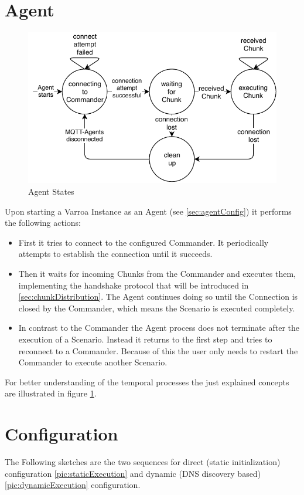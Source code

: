 \section{Agent}
\begin{figure}[H]
	\begin{center}
	\includegraphics[scale=0.9]{Resources/PDF/AgentStates}
	\caption{Agent States}
	\label{pic:AgentStates}
	\end{center}
\end{figure}
Upon starting a Varroa Instance as an Agent (see \ref{sec:agentConfig}) it performs the following actions:
\begin{itemize}
	\item First it tries to connect to the configured Commander.
	It periodically attempts to establish the connection until it succeeds.
	\item Then it waits for incoming Chunks from the Commander and executes them, implementing the handshake protocol that will be introduced in \ref{sec:chunkDistribution}.
	The Agent continues doing so until the Connection is closed by the Commander, which means the Scenario is executed completely.
	\item In contrast to the Commander the Agent process does not terminate after the execution of a Scenario. Instead it returns to the first step and tries to reconnect to a Commander.
	Because of this the user only needs to restart the Commander to execute another Scenario.
\end{itemize}

For better understanding of the temporal processes the just explained concepts are illustrated in figure \ref{pic:AgentStates}.

\section{Configuration}
The Following sketches are the two sequences for direct (static initialization) configuration \ref{pic:staticExecution} and dynamic (DNS discovery based) \ref{pic:dynamicExecution} configuration.

